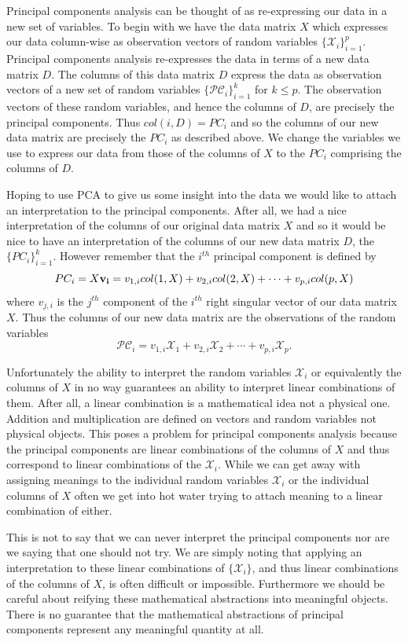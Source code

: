 \documentclass{book}
\begin{document}
Principal components analysis can be thought of as re-expressing our data in a new set of variables. To begin with we have the data matrix $X$ which expresses our data column-wise as observation vectors of random variables $\{\mathscr{X}_i\}_{i=1}^{p}$. Principal components analysis re-expresses the data in terms of a new data matrix $D$. The columns of this data matrix $D$ express the data as observation vectors of a new set of random variables $\{\mathscr{PC}_i\}_{i=1}^{k}$ for $k \leq p$. The observation vectors of these random variables, and hence the columns of $D$, are precisely the principal components. Thus $col(i,D)=PC_i$ and so the columns of our new data matrix are precisely the $PC_i$ as described above. We change the variables we use to express our data from those of the columns of $X$ to the $PC_i$ comprising the columns of $D$. 

Hoping to use PCA to give us some insight into the data we would like to attach an interpretation to the principal components. After all, we had a nice interpretation of the columns of our original data matrix $X$ and so it would be nice to have an interpretation of the columns of our new data matrix $D$, the $\{PC_i\}_{i=1}^{k}$. However remember that the $i^{th}$ principal component is defined by
$$
PC_i=X{\bf v_i}=v_{1,i}col(1,X)+v_{2,i}col(2,X)+\cdots+v_{p,i}col(p,X)
$$
where $v_{j,i}$ is the $j^{th}$ component of the $i^{th}$ right singular vector of our data matrix $X$. Thus the columns of our new data matrix are the observations of the random variables
$$
\mathscr{PC}_i=v_{1,i}\mathscr{X}_1+v_{2,i}\mathscr{X}_2+\cdots+v_{p,i}\mathscr{X}_p.
$$

Unfortunately the ability to interpret the random variables $\mathscr{X}_i$ or equivalently the columns of $X$ in no way guarantees an ability to interpret linear combinations of them. After all, a linear combination is a mathematical idea not a physical one. Addition and multiplication are defined on vectors and random variables not physical objects. This poses a problem for principal components analysis because the principal components are linear combinations of the columns of $X$ and thus correspond to linear combinations of the $\mathscr{X}_i$. While we can get away with assigning meanings to the individual random variables $\mathscr{X}_i$ or the individual columns of $X$ often we get into hot water trying to attach meaning to a linear combination of either. 

This is not to say that we can never interpret the principal components nor are we saying that one should not try. We are simply noting that applying an interpretation to these linear combinations of $\{\mathscr{X}_i\}$, and thus linear combinations of the columns of $X$, is often difficult or impossible. Furthermore we should be careful about reifying these mathematical abstractions into meaningful objects. There is no guarantee that the mathematical abstractions of principal components represent any meaningful quantity at all.  
\end{document}
